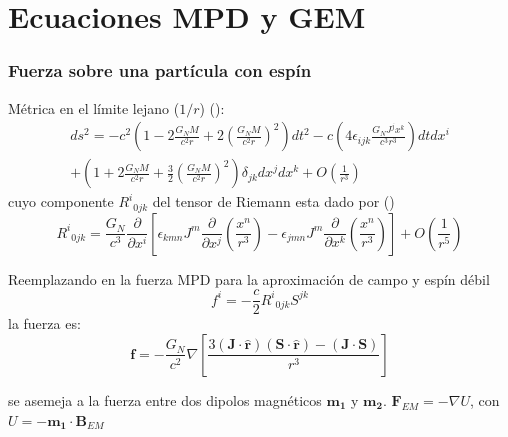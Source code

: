 \documentclass[aspectratio=169,10pt,usenames,dvipsnames,spanish]{beamer}
\begin{document}
\section{Ecuaciones MPD y GEM}
\begin{frame}

\frametitle{Fuerza sobre una partícula con espín}

\small

Métrica en el límite lejano ($1/r$) (\cite{Misner1973}):
\begin{multline}\label{MetricaPotencias1r}
ds^2=-c^2\left(1-2\frac{G_NM}{c^2r}+2\left(\frac{G_NM}{c^2r}\right)^2\right) dt^2-c\left(4 \epsilon_{ijk}\frac{G_N J^j x^k}{c^3r^3}\right) dtdx^i \\+\left(1+2\frac{G_NM}{c^2r}+\frac{3}{2}\left(\frac{G_NM}{c^2r}\right)^2\right)\delta_{jk}dx^j dx^k +O\left(\frac{1}{r^3}\right)
\end{multline}
cuyo componente $R^i{}_{0jk}$ del tensor de Riemann esta dado por (\cite{Wald1972})
\begin{equation}\label{Ri0jk}
	R^i{}_{0jk}=\frac{G_N}{c^3}\frac{\partial}{\partial x^i}\left[\epsilon_{kmn}J^m \frac{\partial}{\partial x^j}\left(\frac{x^n}{r^3}\right)-\epsilon_{jmn}J^m \frac{\partial}{\partial x^k}\left(\frac{x^n}{r^3}\right) \right]+O\left(\frac{1}{r^5}\right)
\end{equation}

Reemplazando en la fuerza MPD para la aproximación de campo y espín débil
\begin{equation}
f^i = -\frac{c}{2}R^i{}_{0jk}S^{jk}
\end{equation}
la fuerza es:
\begin{equation}
\mathbf{f}=-\frac{G_N}{c^2}\nabla\left[
\frac{3(\mathbf{J}\cdot\hat{\mathbf{r}})(\mathbf{S}\cdot\hat{\mathbf{r}})
-(\mathbf{J}\cdot\mathbf{S})}{r^3}
\right]
\end{equation}

se asemeja a la fuerza entre dos dipolos magnéticos $\mathbf{m_1}$ y $\mathbf{m_2}$. $\mathbf{F}_{EM}=-\nabla U$, con $U=-\mathbf{m_1} \cdot \mathbf{B}_{EM}$

\end{frame}
\end{document}
